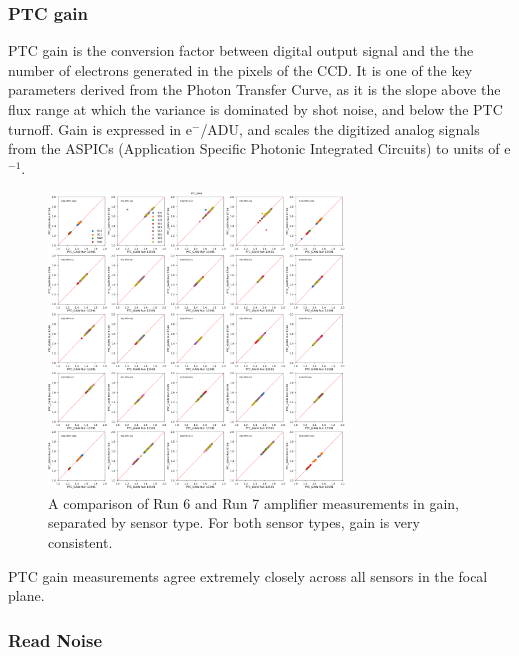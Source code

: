\clearpage
\subsubsection{PTC gain}\label{ptc-gain}

PTC gain is the conversion factor between digital output signal and the the number of electrons generated in the pixels of the CCD. It is one of the key parameters derived from the Photon Transfer
Curve, as it is the slope above the flux range at which the variance is dominated by shot noise, and below the PTC turnoff. Gain is expressed in e$^-$/ADU, and scales the digitized analog signals from the ASPICs (Application Specific Photonic Integrated Circuits) to units of e$^{-1}$.

\begin{figure}[ht]
\begin{centering}
\includegraphics[width=0.7\textwidth]{figures/baselineCharacterization/13591_E749_PTC_GAIN.png}
\caption{A comparison of Run 6 and Run 7 amplifier measurements in gain, separated by sensor type. For both sensor types, gain is very consistent.}
\end{centering}
\end{figure}

PTC gain measurements agree extremely closely across all sensors in the
focal plane.

\clearpage

\subsubsection{Read Noise}\label{sec:initialRever:ReadNoise}

